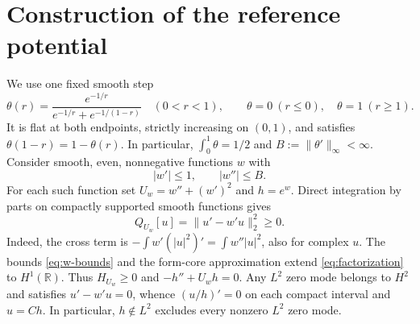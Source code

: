 \documentclass[11pt,a4paper]{article}
\newcommand{\R}{\mathbb R}
\begin{document}
\section{Construction of the reference potential}\label{sec:construction}

We use one fixed smooth step
\begin{equation}\label{eq:theta}
 \theta(r)=\frac{e^{-1/r}}{e^{-1/r}+e^{-1/(1-r)}}\quad(0<r<1),
 \qquad \theta=0\ (r\leq0),\quad \theta=1\ (r\geq1).
\end{equation}
It is flat at both endpoints, strictly increasing on $(0,1)$, and satisfies
$\theta(1-r)=1-\theta(r)$. In particular,
$\int_0^1\theta=1/2$ and $B:=\|\theta'\|_\infty<\infty$. Consider smooth,
even, nonnegative functions $w$ with
\begin{equation}\label{eq:w-bounds}
 |w'|\leq1,\qquad |w''|\leq B.
\end{equation}
For each such function set $U_w=w''+(w')^2$ and $h=e^w$. Direct integration
by parts on compactly supported smooth functions gives
\begin{equation}\label{eq:factorization}
 Q_{U_w}[u]=\|u'-w'u\|_2^2\geq0.
\end{equation}
Indeed, the cross term is $-\int w'(|u|^2)'=\int w''|u|^2$, also for
complex $u$. The bounds \eqref{eq:w-bounds} and the form-core approximation
extend \eqref{eq:factorization} to $H^1(\R)$. Thus $H_{U_w}\geq0$ and
$-h''+U_wh=0$. Any $L^2$ zero mode belongs to $H^2$ and satisfies
$u'-w'u=0$, whence $(u/h)'=0$ on each compact interval and $u=Ch$.
In particular, $h\notin L^2$ excludes every nonzero $L^2$ zero mode.
\end{document}
